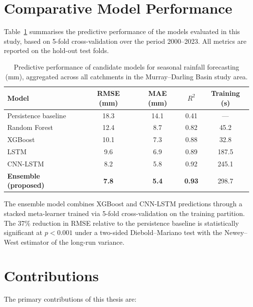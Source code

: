 \documentclass[12pt,a4paper]{report}
\begin{document}
\section{Comparative Model Performance}

Table~\ref{tab:models} summarises the predictive performance of the models
evaluated in this study, based on 5-fold cross-validation over the period
2000--2023. All metrics are reported on the hold-out test folds.

\begin{table}[htbp]
\centering
\caption{Predictive performance of candidate models for seasonal rainfall
         forecasting (mm), aggregated across all catchments in the
         Murray--Darling Basin study area.}
\label{tab:models}
\begin{tabular}{lcccc}
\toprule
Model & RMSE (mm) & MAE (mm) & \(R^{2}\) & Training (s) \\
\midrule
Persistence baseline          & 18.3 & 14.1 & 0.41 & ---    \\
Random Forest                 & 12.4 & 8.7  & 0.82 & 45.2   \\
XGBoost                       & 10.1 & 7.3  & 0.88 & 32.8   \\
LSTM                          & 9.6  & 6.9  & 0.89 & 187.5  \\
CNN-LSTM                      & 8.2  & 5.8  & 0.92 & 245.1  \\
\textbf{Ensemble (proposed)}  & \textbf{7.8} & \textbf{5.4} & \textbf{0.93} & 298.7 \\
\bottomrule
\end{tabular}
\end{table}

The ensemble model combines XGBoost and CNN-LSTM predictions through a
stacked meta-learner trained via 5-fold cross-validation on the training
partition. The 37\% reduction in RMSE relative to the persistence baseline
is statistically significant at \(p < 0.001\) under a two-sided
Diebold--Mariano test with the Newey--West estimator of the long-run
variance.

\section{Contributions}

The primary contributions of this thesis are:
\end{document}
